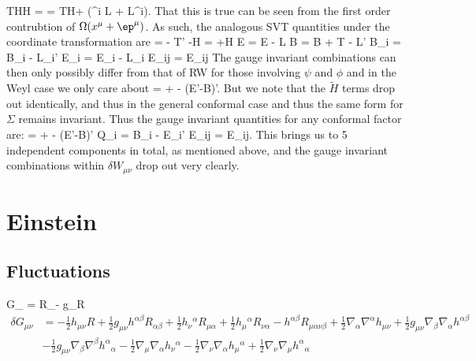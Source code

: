 \documentclass[10pt,letterpaper]{article}
\newcommand{\hu}{\mathcal H}
\begin{document}
\be
	T\hu \to \tilde H = \frac{\ep^\mu \pd_\mu \Omega}{\Omega} = T\hu + (\pd^i L + L^i).
\ee
That this is true can be seen from the first order contrubtion of $\Omega(x^\mu + \ep^\mu)$. As such, the analogous SVT quantities under the coordinate transformation are
\be
	\tilde \phi = \phi - T' -\tilde H 
\ee
\be
	\tilde \psi = \psi +\tilde H
\ee
\be
	\tilde E = E - L
\ee
\be
	\tilde B = B + T - L'
\ee
\be
	\tilde B_i = B_i - L_i'
\ee
\be
	\tilde E_i = E_i - L_i
\ee
\be
	\tilde E_{ij} = E_{ij}
\ee
The gauge invariant combinations can then only possibly differ from that of RW for those involving $\psi$ and $\phi$ and in the Weyl case we only care about 
\be
	\Sigma = \phi + \psi - (E'-B)'.
\ee
But we note that the $\tilde H$ terms drop out identically, and thus in the general conformal case and thus the same form for $\Sigma$ remains invariant. Thus the gauge invariant quantities for any conformal factor are:
\be
	\Sigma = \phi + \psi - (E'-B)'
\ee
\be
	\mathcal Q_i = B_i - E_i'
\ee
\be
	E_{ij} = E_{ij}.
\ee
This brings us to 5 independent components in total, as mentioned above, and the gauge invariant combinations within $\delta W_{\mu\nu}$ drop out very clearly.
\newpage
\section{Einstein}
\subsection{Fluctuations}
\be
	G_{\mu\nu} = R_{\mu\nu}- g_{\mu\nu}R
\ee
\begin{align}
	\delta G_{\mu\nu} & = 
- \tfrac{1}{2} h_{\mu \nu} R + \tfrac{1}{2} g_{\mu \nu} h^{\alpha \beta} R_{\alpha \beta} + \tfrac{1}{2} h_{\nu}{}^{\alpha} R_{\mu \alpha} + \tfrac{1}{2} h_{\mu}{}^{\alpha} R_{\nu \alpha} -  h^{\alpha \beta} R_{\mu \alpha \nu \beta} + \tfrac{1}{2} \nabla_{\alpha}\nabla^{\alpha}h_{\mu \nu} + \tfrac{1}{2} g_{\mu \nu} \nabla_{\beta}\nabla_{\alpha}h^{\alpha \beta}\\
& -  \tfrac{1}{2} g_{\mu \nu} \nabla_{\beta}\nabla^{\beta}h^{\alpha}{}_{\alpha} -  \tfrac{1}{2} \nabla_{\mu}\nabla_{\alpha}h_{\nu}{}^{\alpha} -  \tfrac{1}{2} \nabla_{\nu}\nabla_{\alpha}h_{\mu}{}^{\alpha} + \tfrac{1}{2} \nabla_{\nu}\nabla_{\mu}h^{\alpha}{}_{\alpha}
\end{align}
\end{document}

